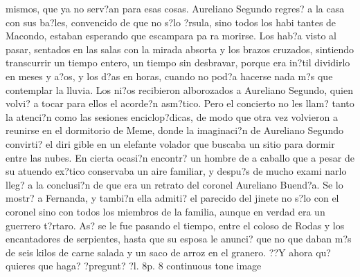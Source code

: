 mismos, que ya no serv?an para esas cosas. Aureliano Segundo regres? a la casa con sus ba?les, convencido de que no s?lo ?rsula, sino todos los habi tantes de Macondo, estaban esperando que escampara pa ra morirse. Los hab?a visto al pasar, sentados en las salas con la mirada absorta y los brazos cruzados, sintiendo transcurrir un tiempo entero, un tiempo sin desbravar, porque era in?til dividirlo en meses y a?os, y los d?as en horas, cuando no pod?a hacerse nada m?s que contemplar la lluvia. Los ni?os recibieron alborozados a Aureliano Segundo, quien volvi? a tocar para ellos el acorde?n asm?tico. Pero el concierto no les llam? tanto la atenci?n como las sesiones enciclop?dicas, de modo que otra vez volvieron a reunirse en el dormitorio de Meme, donde la imaginaci?n de Aureliano Segundo convirti? el diri gible en un elefante volador que buscaba un sitio para dormir entre las nubes. En cierta ocasi?n encontr? un hombre de a caballo que a pesar de su atuendo ex?tico conservaba un aire familiar, y despu?s de mucho exami narlo lleg? a la conclusi?n de que era un retrato del coronel Aureliano Buend?a. Se lo mostr? a Fernanda, y tambi?n ella admiti? el parecido del jinete no s?lo con el coronel sino con todos los miembros de la familia, aunque en verdad era un guerrero t?rtaro. As? se le fue pasando el tiempo, entre el coloso de Rodas y los encantadores de serpientes, hasta que su esposa le anunci? que no que daban m?s de seis kilos de carne salada y un saco de arroz en el granero. ??Y ahora qu? quieres que haga? ?pregunt? ?l. 8p. 8
continuous tone image

